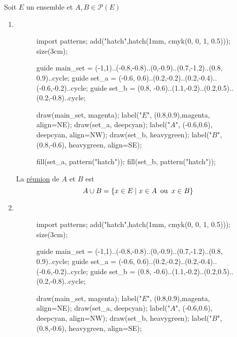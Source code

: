\begin{defn}
	Soit $E$ un ensemble et $A, B \in \mathcal{P}(E)$
	\begin{enumerate}
		\item ~\\
			\begin{minipage}
				{\linewidth}
				\begin{wrapfigure}{r}{3cm}
					\centering
					\vspace{-7mm}
					\begin{asy}
						import patterns;
						add("hatch",hatch(1mm, cmyk(0, 0, 1, 0.5)));
						size(3cm);

						guide main_set = (-1,1)..(-0.8,-0.8)..(0,-0.9)..(0.7,-1.2)..(0.8, 0.9)..cycle;
						guide set_a = (-0.6, 0.6)..(0.2,-0.2)..(0.2,-0.4)..(-0.6,-0.2)..cycle;
						guide set_b = (0.8, -0.6)..(1.1,-0.2)..(0.2,0.5)..(0.2,-0.8)..cycle;

						draw(main_set, magenta); label("$E$", (0.8,0.9),magenta, align=NE);
						draw(set_a, deepcyan); label("$A$", (-0.6,0.6), deepcyan, align=NW);
						draw(set_b, heavygreen); label("$B$", (0.8,-0.6), heavygreen, align=SE);

						fill(set_a, pattern("hatch"));
						fill(set_b, pattern("hatch"));
					\end{asy}
				\end{wrapfigure}
				La \underline{réunion} de $A$ et $B$ est \[
					A \cup B = \{x \in E  \mid x \in A \operatorname{\text{ ou }} x \in B\}
				\]
			\end{minipage}
			\vspace{2cm}
		\item ~\\
			\begin{minipage}
				{\linewidth}
				\begin{wrapfigure}{r}{3cm}
					\centering
					\vspace{-7mm}
					\begin{asy}
						import patterns;
						add("hatch",hatch(1mm, cmyk(0, 0, 1, 0.5)));
						size(3cm);

						guide main_set = (-1,1)..(-0.8,-0.8)..(0,-0.9)..(0.7,-1.2)..(0.8, 0.9)..cycle;
						guide set_a = (-0.6, 0.6)..(0.2,-0.2)..(0.2,-0.4)..(-0.6,-0.2)..cycle;
						guide set_b = (0.8, -0.6)..(1.1,-0.2)..(0.2,0.5)..(0.2,-0.8)..cycle;

						draw(main_set, magenta); label("$E$", (0.8,0.9),magenta, align=NE);
						draw(set_a, deepcyan); label("$A$", (-0.6,0.6), deepcyan, align=NW);
						draw(set_b, heavygreen); label("$B$", (0.8,-0.6), heavygreen, align=SE);


\end{asy}
\end{wrapfigure}
\end{minipage}
\end{enumerate}
\end{defn}
